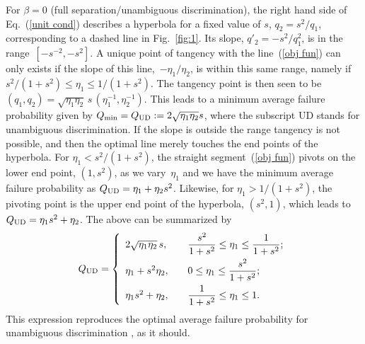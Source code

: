 \documentclass[aps,pra,twocolumn,showpacs]{revtex4-1}
\begin{document}
{For $\beta=0$ (full separation/unambiguous discrimination),  the right hand side of Eq.~(\ref{unit cond}) describes a hyperbola for a fixed value of $s$, $q_2=s^2/q_1$, corresponding to a dashed line in Fig.~\ref{fig:1}. Its  slope, $q'_2=-s^2/q_1^2$, is in the range~$[-s^{-2},-s^{2}]$.  A unique point of tangency with the line~(\ref{obj fun}) can only exists if the slope of this line,~$-\eta_1/\eta_2$, is within this same range, namely if $s^2/(1+s^2)\le \eta_1\le1/(1+s^2)$.
%
The tangency point is then seen to be $(q_1,q_2)=\sqrt{\eta_1\eta_2}\,s\, (\eta^{-1}_1,\eta^{-1}_2 )$. This leads to a minimum average failure probability given by $Q_{\rm min}=Q_{\rm UD}:=2\sqrt{\eta_1\eta_2}s$, where the subscript UD stands for unambiguous discrimination.
%
If the slope is outside the range tangency is not possible, and then the optimal line merely touches the end points of the hyperbola. For $\eta_1<s^2/(1+s^2)$, the straight segment~(\ref{obj fun}) pivots on the lower end point, $(1,s^2)$, as we vary~$\eta_1$ and we have the minimum average failure probability as $Q_{\rm UD}=\eta_1+\eta_2 s^2$. Likewise, for $\eta_1>1/(1+s^2)$, the pivoting point is the upper end point of the hyperbola, $(s^2,1)$, which leads to~$Q_{\rm UD}=\eta_1 s^2+\eta_2$. The above can be summarized by
%
\begin{equation}
Q_{\rm UD}=\left\{
\begin{array}{ll}
2\sqrt{\eta_1\eta_2}\, s,&\displaystyle \frac{s^{2}}{1+s^{2}}\le\eta_1\le \frac{1}{1+s^{2}};\\[.8em]
\eta_1+s^{2} \eta_2, \quad &\displaystyle 0\le \eta_1\le \frac{s^{2}}{1+s^{2}};\\[.8em]
\eta_1 s^2+ \eta_2, \quad &\displaystyle \frac{1}{1+s^{2}}\le\eta_1\le  1.
\end{array}
\right.
\label{UD}
\end{equation}
%
This expression reproduces the optimal average failure probability for unambiguous 
discrimination \cite{Jaeger&Shimony}, as it should.

}
\end{document}
